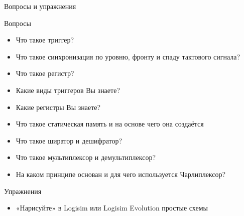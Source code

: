 \documentclass[xetex,aspectratio=43]{beamer}
\begin{document}
\begin{frame}{Вопросы и упражнения}

    \begin{block}{Вопросы}
        \begin{itemize}
            \tightlist
            \item
            Что такое триггер?
            \item
            Что такое синхронизация по уровню, фронту и спаду тактового сигнала?
            \item
            Что такое регистр?
            \item
            Какие виды триггеров Вы знаете?
            \item
            Какие регистры Вы знаете?
            \item
            Что такое статическая память и на основе чего она создаётся
            \item
            Что такое ширатор и дешифратор?
            \item
            Что такое мультиплексор и демультиплексор?
            \item
            На каком принципе основан и для чего используется Чарлиплексор?
        \end{itemize}
    \end{block}

    \begin{block}{Упражнения}
        \begin{itemize}
            \tightlist
            \item
            «Нарисуйте» в Logisim или Logisim Evolution простые схемы
        \end{itemize}


    \end{block}
\end{frame}

\postamble
\end{document}
